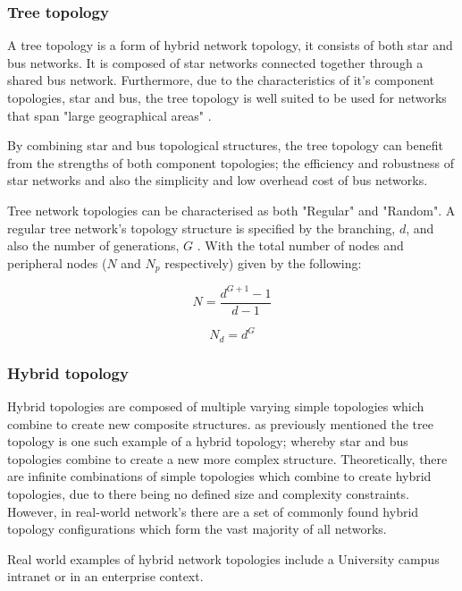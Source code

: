 \subsubsection{Tree topology}
A tree topology is a form of hybrid network topology, it consists of both star and bus networks. It is composed of star networks connected together through a shared bus network. \cite{tree_book} Furthermore, due to the characteristics of it's component topologies, star and bus, the tree topology is well suited to be used for networks that span "large geographical areas" \cite{Qos_simulation}. 

By combining star and bus topological structures, the tree topology can benefit from the strengths of both component topologies; the efficiency and robustness of star networks and also the simplicity and low overhead cost of bus networks.

Tree network topologies can be characterised as both "Regular" and "Random". A regular tree network's topology structure is specified by the branching, $d$, and also the number of generations, $G$ \cite{tree_nature}. With the total number of nodes and peripheral nodes ($N$ and $N_p$ respectively) given by the following:

\begin{equation}
    N = \frac{d^{G+1}-1}{d-1}
\end{equation}

\begin{equation}
    N_d = d^G
\end{equation}

\subsubsection{Hybrid topology}
Hybrid topologies are composed of multiple varying simple topologies which combine to create new composite structures. as previously mentioned the tree topology is one such example of a hybrid topology; whereby star and bus topologies combine to create a new more complex structure. Theoretically, there are infinite combinations of simple topologies which combine to create hybrid topologies, due to there being no defined size and complexity constraints. However, in real-world network's there are a set of commonly found hybrid topology configurations which form the vast majority of all networks.

Real world examples of hybrid network topologies include a University campus intranet or in an enterprise context. 

